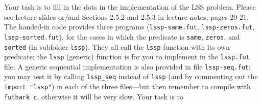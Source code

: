 \documentclass{article}
\begin{document}
Your task is to fill in the dots in the implementation of the LSS problem. Please see lecture slides or/and Sections 2.5.2 and 2.5.3 in lecture notes, pages 20-21. The handed-in code provides three programs (\texttt{lssp-same.fut}, \texttt{lssp-zeros.fut}, \texttt{lssp-sorted.fut}), for the cases in which the predicate is \texttt{same}, \texttt{zeros}, and \texttt{sorted} (in subfolder \texttt{lssp}).    They all call the \texttt{lssp} function with its own predicate; the \texttt{lssp} (generic) function is for you to implement in the \texttt{lssp.fut} file.  A generic sequential implementation is also provided in file \texttt{lssp-seq.fut}; you may test it by calling \texttt{lssp\_seq} instead of \texttt{lssp} (and by commenting out the \texttt{import "lssp"}) in each of the three files---but then remember to compile with \texttt{futhark c}, otherwise it will be very slow. Your task is to
\end{document}
